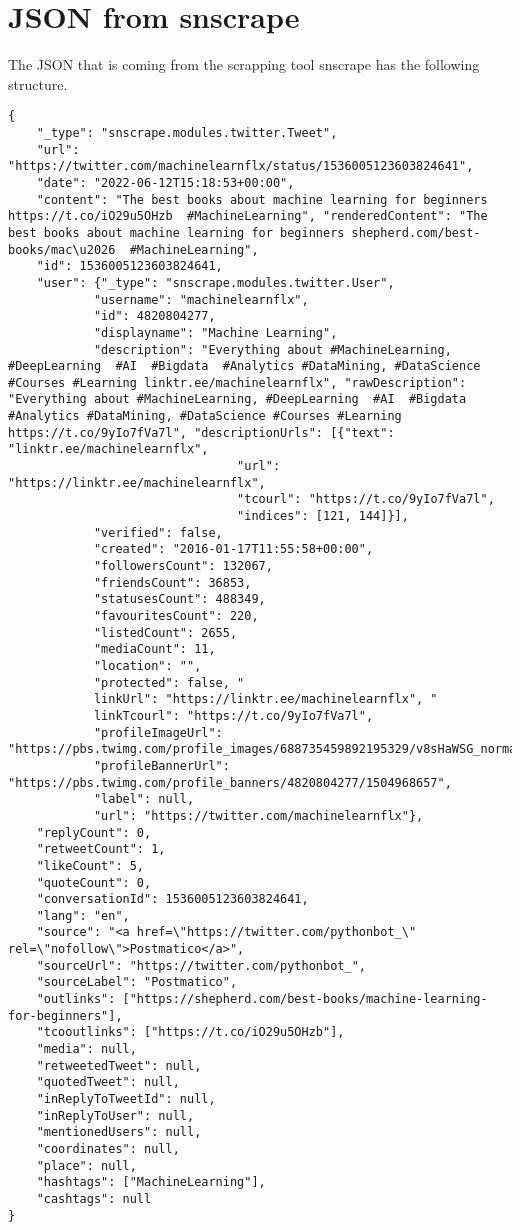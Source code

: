 \chapter{JSON from snscrape}
\label{appendix:JSONsnscrape}

The JSON that is coming from the scrapping tool snscrape has the following structure.

\begin{lstlisting}[label={code:JSONtweets}, caption={JSON output from snscrape}]
{
    "_type": "snscrape.modules.twitter.Tweet", 
    "url": "https://twitter.com/machinelearnflx/status/1536005123603824641", 
    "date": "2022-06-12T15:18:53+00:00", 
    "content": "The best books about machine learning for beginners https://t.co/iO29u5OHzb  #MachineLearning", "renderedContent": "The best books about machine learning for beginners shepherd.com/best-books/mac\u2026  #MachineLearning", 
    "id": 1536005123603824641, 
    "user": {"_type": "snscrape.modules.twitter.User", 
            "username": "machinelearnflx", 
            "id": 4820804277, 
            "displayname": "Machine Learning", 
            "description": "Everything about #MachineLearning, #DeepLearning  #AI  #Bigdata  #Analytics #DataMining, #DataScience #Courses #Learning linktr.ee/machinelearnflx", "rawDescription": "Everything about #MachineLearning, #DeepLearning  #AI  #Bigdata  #Analytics #DataMining, #DataScience #Courses #Learning https://t.co/9yIo7fVa7l", "descriptionUrls": [{"text": "linktr.ee/machinelearnflx", 
                                "url": "https://linktr.ee/machinelearnflx", 
                                "tcourl": "https://t.co/9yIo7fVa7l", 
                                "indices": [121, 144]}], 
            "verified": false, 
            "created": "2016-01-17T11:55:58+00:00", 
            "followersCount": 132067, 
            "friendsCount": 36853,
            "statusesCount": 488349, 
            "favouritesCount": 220, 
            "listedCount": 2655, 
            "mediaCount": 11, 
            "location": "", 
            "protected": false, "
            linkUrl": "https://linktr.ee/machinelearnflx", "
            linkTcourl": "https://t.co/9yIo7fVa7l", 
            "profileImageUrl": "https://pbs.twimg.com/profile_images/688735459892195329/v8sHaWSG_normal.jpg", 
            "profileBannerUrl": "https://pbs.twimg.com/profile_banners/4820804277/1504968657", 
            "label": null, 
            "url": "https://twitter.com/machinelearnflx"}, 
    "replyCount": 0, 
    "retweetCount": 1, 
    "likeCount": 5, 
    "quoteCount": 0, 
    "conversationId": 1536005123603824641, 
    "lang": "en", 
    "source": "<a href=\"https://twitter.com/pythonbot_\" rel=\"nofollow\">Postmatico</a>", 
    "sourceUrl": "https://twitter.com/pythonbot_", 
    "sourceLabel": "Postmatico", 
    "outlinks": ["https://shepherd.com/best-books/machine-learning-for-beginners"], 
    "tcooutlinks": ["https://t.co/iO29u5OHzb"], 
    "media": null, 
    "retweetedTweet": null, 
    "quotedTweet": null, 
    "inReplyToTweetId": null, 
    "inReplyToUser": null, 
    "mentionedUsers": null, 
    "coordinates": null, 
    "place": null, 
    "hashtags": ["MachineLearning"], 
    "cashtags": null
}

\end{lstlisting}